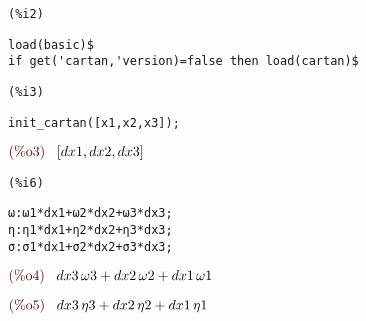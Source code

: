 \noindent
\begin{minipage}[t]{8ex}\color{red}\bf
\begin{verbatim}
(%i2) 
\end{verbatim}
\end{minipage}
\begin{minipage}[t]{\textwidth}\color{blue}
\begin{verbatim}
load(basic)$
if get('cartan,'version)=false then load(cartan)$
\end{verbatim}
\end{minipage}

\smallskip

\noindent
\begin{minipage}[t]{8ex}\color{red}\bf
\begin{verbatim}
(%i3) 
\end{verbatim}
\end{minipage}
\begin{minipage}[t]{\textwidth}\color{blue}
\begin{verbatim}
init_cartan([x1,x2,x3]);
\end{verbatim}
\end{minipage}
\begin{math}\displaystyle
\parbox{8ex}{\color{labelcolor}(\%o3) }
[dx1,dx2,dx3]
\end{math}


\noindent
\begin{minipage}[t]{8ex}\color{red}\bf
\begin{verbatim}
(%i6) 
\end{verbatim}
\end{minipage}
\begin{minipage}[t]{\textwidth}\color{blue}
\begin{verbatim}
ω:ω1*dx1+ω2*dx2+ω3*dx3;
η:η1*dx1+η2*dx2+η3*dx3;
σ:σ1*dx1+σ2*dx2+σ3*dx3;
\end{verbatim}
\end{minipage}
\begin{math}\displaystyle
\parbox{8ex}{\color{labelcolor}(\%o4) }
dx3\,\omega3+dx2\,\omega2+dx1\,\omega1
\end{math}

\noindent
\begin{math}\displaystyle
\parbox{8ex}{\color{labelcolor}(\%o5) }
dx3\,\eta3+dx2\,\eta2+dx1\,\eta1
\end{math}

